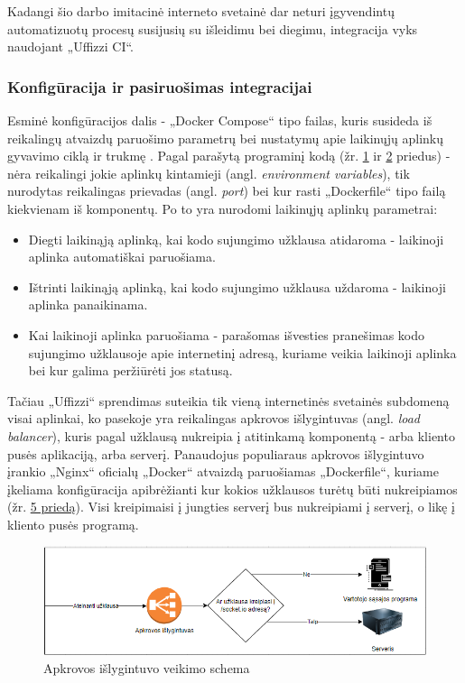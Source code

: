 \documentclass{VUMIFPSkursinis}
\begin{document}
Kadangi šio darbo imitacinė interneto svetainė dar neturi įgyvendintų automatizuotų procesų susijusių su išleidimu bei diegimu, integracija vyks naudojant „Uffizzi CI“.

    \subsubsection{Konfigūracija ir pasiruošimas integracijai}

Esminė konfigūracijos dalis - „Docker Compose“ tipo failas, kuris susideda iš reikalingų atvaizdų paruošimo parametrų bei nustatymų apie laikinųjų aplinkų gyvavimo ciklą ir trukmę \cite{SaltKeturioliktas}. Pagal parašytą programinį kodą (žr. \hyperref[priedas1]{1} ir \hyperref[priedas2]{2} priedus) - nėra reikalingi jokie aplinkų kintamieji (angl. \textit{environment variables}), tik nurodytas reikalingas prievadas (angl. \textit{port}) bei kur rasti „Dockerfile“ tipo failą kiekvienam iš komponentų. Po to yra nurodomi laikinųjų aplinkų parametrai:

\begin{itemize}
  \item Diegti laikinąją aplinką, kai kodo sujungimo užklausa atidaroma - laikinoji aplinka automatiškai paruošiama.

  \item Ištrinti laikinąją aplinką, kai kodo sujungimo užklausa uždaroma - laikinoji aplinka panaikinama.

  \item Kai laikinoji aplinka paruošiama - parašomas išvesties pranešimas kodo sujungimo užklausoje apie internetinį adresą, kuriame veikia laikinoji aplinka bei kur galima peržiūrėti jos statusą.
  
\end{itemize}

Tačiau „Uffizzi“ sprendimas suteikia tik vieną internetinės svetainės subdomeną visai aplinkai, ko pasekoje yra reikalingas apkrovos išlygintuvas (angl. \textit{load balancer}), kuris pagal užklausą nukreipia į atitinkamą komponentą - arba kliento pusės aplikaciją, arba serverį. Panaudojus populiaraus apkrovos išlygintuvo įrankio „Nginx“ oficialų „Docker“ atvaizdą paruošiamas „Dockerfile“, kuriame įkeliama konfigūracija apibrėžianti kur kokios užklausos turėtų būti nukreipiamos (žr. \hyperref[priedas5]{5 priedą}). Visi kreipimaisi į jungties serverį bus nukreipiami į serverį, o likę į kliento pusės programą.

\begin{figure}[H]
    \centering
    \includegraphics[scale=0.8]{img/lbschema.png}
    \caption{Apkrovos išlygintuvo veikimo schema}
    \label{img:mlp}
\end{figure}
\end{document}
